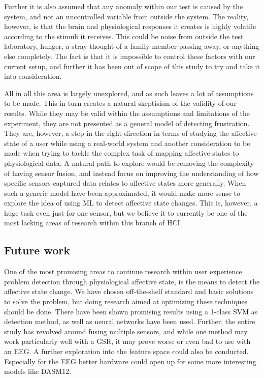 Further it is also assumed that any anomaly within our test is caused by the system, and not an uncontrolled variable from outside the system. 
The reality, however, is that the brain and physiological responses it creates is highly volatile according to the stimuli it receives.
This could be noise from outside the test laboratory, hunger, a stray thought of a family member passing away, or anything else completely. 
The fact is that it is impossible to control these factors with our current setup, and further it has been out of scope of this study to try and take it into consideration.

All in all this area is largely unexplored, and as such leaves a lot of assumptions to be made.
This in turn creates a natural skeptisism of the validity of our results.
While they may be valid within the assumptions and limitations of the experiment, they are not presented as a general model of detecting frustration. 
They are, however, a step in the right direction in terms of studying the affective state of a user while using a real-world system and another consideration to be made when trying to tackle the complex task of mapping affective states to physiological data. 
A natural path to explore would be removing the complexity of having sensor fusion, and instead focus on improving the understanding of how specific sensors captured data relates to affective states more generally. 
When such a generic model have been approximated, it would make more sense to explore the idea of using ML to detect affective state changes.
This is, however, a huge task even just for one sensor, but we believe it to currently be one of the most lacking areas of research within this branch of HCI.


\subsection{Future work}
One of the most promising areas to continue research within user experience problem detection through physiological affective state, is the means to detect the affective state change. 
We have chosen off-the-shelf standard and basic solutions to solve the problem, but doing research aimed at optimizing these techniques should be done. 
There have been shown promising results using a 1-class SVM as detection method, as well as neural networks have been used.
Further, the entire study has revolved around fusing multiple sensors, and while one method may work particularly well with a GSR, it may prove worse or even bad to use with an EEG. 
A further exploration into the feature space could also be conducted. 
Especially for the EEG better hardware could open up for some more interesting models like DASM12\cite{eeg_music_listening}. 

